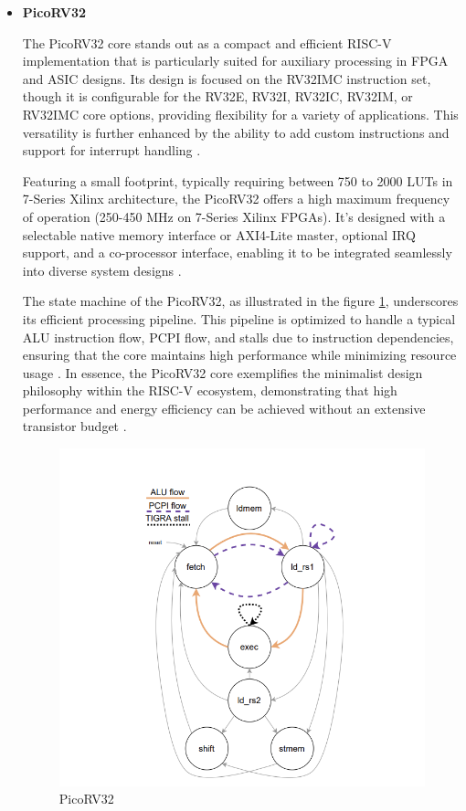 \documentclass[conference]{IEEEtran}
\begin{document}
\begin{itemize} 

\item\textbf{PicoRV32}

The PicoRV32 core stands out as a compact and efficient RISC-V implementation that is particularly suited for auxiliary processing in FPGA and ASIC designs. Its design is focused on the RV32IMC instruction set, though it is configurable for the RV32E, RV32I, RV32IC, RV32IM, or RV32IMC core options, providing flexibility for a variety of applications. This versatility is further enhanced by the ability to add custom instructions and support for interrupt handling \cite{8}.

Featuring a small footprint, typically requiring between 750 to 2000 LUTs in 7-Series Xilinx architecture, the PicoRV32 offers a high maximum frequency of operation (250-450 MHz on 7-Series Xilinx FPGAs). It's designed with a selectable native memory interface or AXI4-Lite master, optional IRQ support, and a co-processor interface, enabling it to be integrated seamlessly into diverse system designs \cite{9}.

The state machine of the PicoRV32, as illustrated in the figure \ref{fig:4}, underscores its efficient processing pipeline. This pipeline is optimized to handle a typical ALU instruction flow, PCPI flow, and stalls due to instruction dependencies, ensuring that the core maintains high performance while minimizing resource usage \cite{8}. 
In essence, the PicoRV32 core exemplifies the minimalist design philosophy within the RISC-V ecosystem, demonstrating that high performance and energy efficiency can be achieved without an extensive transistor budget \cite{8}.
\begin{figure}[ht]
\begin{center}
  \includegraphics[scale=0.28]{Screenshot 2023-11-17 at 18.53.50 (1).png}
\end{center}
  \caption{PicoRV32}
  \label{fig:4}
\end{figure}



\end{itemize}
\end{document}
